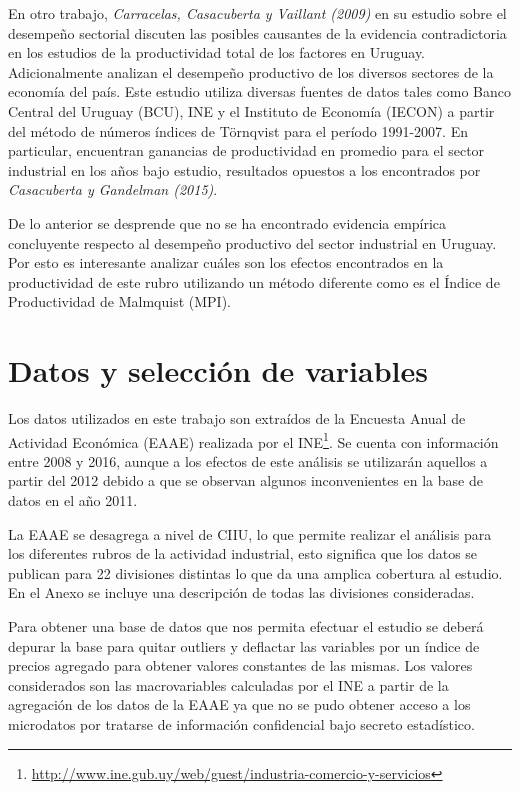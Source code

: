 \documentclass[
]{article}
\begin{document}
En otro trabajo, \emph{Carracelas, Casacuberta y Vaillant (2009)} en su
estudio sobre el desempeño sectorial discuten las posibles causantes de
la evidencia contradictoria en los estudios de la productividad total de
los factores en Uruguay. Adicionalmente analizan el desempeño productivo
de los diversos sectores de la economía del país. Este estudio utiliza
diversas fuentes de datos tales como Banco Central del Uruguay (BCU),
INE y el Instituto de Economía (IECON) a partir del método de números
índices de Törnqvist para el período 1991-2007. En particular,
encuentran ganancias de productividad en promedio para el sector
industrial en los años bajo estudio, resultados opuestos a los
encontrados por \emph{Casacuberta y Gandelman (2015)}.

De lo anterior se desprende que no se ha encontrado evidencia empírica
concluyente respecto al desempeño productivo del sector industrial en
Uruguay. Por esto es interesante analizar cuáles son los efectos
encontrados en la productividad de este rubro utilizando un método
diferente como es el Índice de Productividad de Malmquist (MPI).

\hypertarget{datos-y-selecciuxf3n-de-variables}{%
\section{Datos y selección de
variables}\label{datos-y-selecciuxf3n-de-variables}}

Los datos utilizados en este trabajo son extraídos de la Encuesta Anual
de Actividad Económica (EAAE) realizada por el INE\footnote{\url{http://www.ine.gub.uy/web/guest/industria-comercio-y-servicios}}.
Se cuenta con información entre 2008 y 2016, aunque a los efectos de
este análisis se utilizarán aquellos a partir del 2012 debido a que se
observan algunos inconvenientes en la base de datos en el año 2011.

La EAAE se desagrega a nivel de CIIU, lo que permite realizar el
análisis para los diferentes rubros de la actividad industrial, esto
significa que los datos se publican para 22 divisiones distintas lo que
da una amplica cobertura al estudio. En el Anexo se incluye una
descripción de todas las divisiones consideradas.

Para obtener una base de datos que nos permita efectuar el estudio se
deberá depurar la base para quitar outliers y deflactar las variables
por un índice de precios agregado para obtener valores constantes de las
mismas. Los valores considerados son las macrovariables calculadas por
el INE a partir de la agregación de los datos de la EAAE ya que no se
pudo obtener acceso a los microdatos por tratarse de información
confidencial bajo secreto estadístico.
\end{document}
